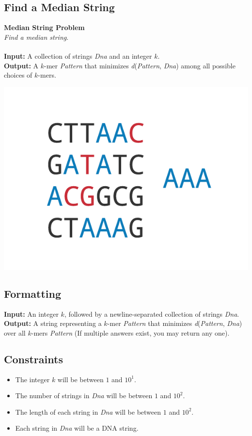 \documentclass{article}
\begin{document}
\subsection{Find a Median String}
\hline\vspace{5}
\noindent\textbf{Median String Problem}\\
\emph{Find a median string}.\\ \\
\textbf{Input:} A collection of strings \emph{Dna} and an integer $k$.\\
\textbf{Output:} A $k$-mer \emph{Pattern} that minimizes \emph{d}(\emph{Pattern}, \emph{Dna}) among all possible choices of $k$-mers.
\begin{center}
    \includegraphics[scale=0.2]{c2/logos/2B.png} 
\end{center}
\hline\vspace{5}

\subsection*{Formatting}
\textbf{Input:} An integer $k$, followed by a newline-separated collection of strings \emph{Dna}.\\
\noindent\textbf{Output:} A string representing a $k$-mer \emph{Pattern} that minimizes \emph{d}(\emph{Pattern}, \emph{Dna}) over all $k$-mers \emph{Pattern} (If multiple answers exist, you may return any one).

\subsection*{Constraints}
\begin{itemize}
    \item The integer $k$ will be between $1$ and $10^1$.
    \item The number of strings in \emph{Dna} will be between $1$ and $10^2$.
    \item The length of each string in \emph{Dna} will be between $1$ and $10^2$.
    \item Each string in \emph{Dna} will be a DNA string.
\end{itemize}
\pagebreak
\end{document}
